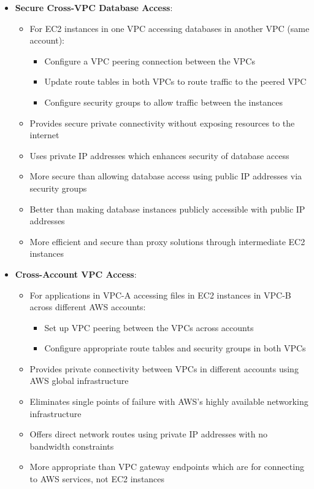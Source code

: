 \documentclass[11pt,a4paper]{report}
\begin{document}
\begin{itemize}
  \item \textbf{Secure Cross-VPC Database Access}:
\begin{itemize}
  \item For EC2 instances in one VPC accessing databases in another VPC (same account):
\begin{itemize}
  \item Configure a VPC peering connection between the VPCs
  \item Update route tables in both VPCs to route traffic to the peered VPC
  \item Configure security groups to allow traffic between the instances
\end{itemize}
  \item Provides secure private connectivity without exposing resources to the internet
  \item Uses private IP addresses which enhances security of database access
  \item More secure than allowing database access using public IP addresses via security groups
  \item Better than making database instances publicly accessible with public IP addresses
  \item More efficient and secure than proxy solutions through intermediate EC2 instances
\end{itemize}
  \item \textbf{Cross-Account VPC Access}:
\begin{itemize}
  \item For applications in VPC-A accessing files in EC2 instances in VPC-B across different AWS accounts:
\begin{itemize}
  \item Set up VPC peering between the VPCs across accounts
  \item Configure appropriate route tables and security groups in both VPCs
\end{itemize}
  \item Provides private connectivity between VPCs in different accounts using AWS global infrastructure
  \item Eliminates single points of failure with AWS's highly available networking infrastructure
  \item Offers direct network routes using private IP addresses with no bandwidth constraints
  \item More appropriate than VPC gateway endpoints which are for connecting to AWS services, not EC2 instances

\end{itemize}
\end{itemize}
\end{document}
